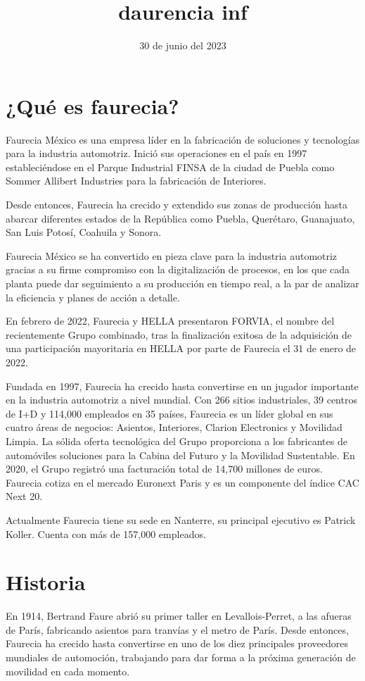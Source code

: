 \documentclass[letterpaper,12pt]{article}
\title {\textbf{daurencia inf}}
\date{30 de junio del 2023}
\begin{document}
\begin{sloppypar} 
\section*{¿Qué es faurecia?}
Faurecia México es una empresa líder en la fabricación de soluciones y tecnologías para la industria automotriz. Inició sus operaciones en el país en 1997 estableciéndose en el Parque Industrial FINSA de la ciudad de Puebla como Sommer Allibert Industries para la fabricación de Interiores.

Desde entonces, Faurecia ha crecido y extendido sus zonas de producción hasta abarcar diferentes estados de la República como Puebla, Querétaro, Guanajuato, San Luis Potosí, Coahuila y Sonora.

Faurecia México se ha convertido en pieza clave para la industria automotriz gracias a su firme compromiso con la digitalización de procesos, en los que cada planta puede dar seguimiento a su producción en tiempo real, a la par de analizar la eficiencia y planes de acción a detalle. 

En febrero de 2022, Faurecia y HELLA presentaron FORVIA, el nombre del recientemente Grupo combinado, tras la finalización exitosa de la adquisición de una participación mayoritaria en HELLA por parte de Faurecia el 31 de enero de 2022.

Fundada en 1997, Faurecia ha crecido hasta convertirse en un jugador importante en la industria automotriz a nivel mundial. Con 266 sitios industriales, 39 centros de I+D y 114,000 empleados en 35 países, Faurecia es un líder global en sus cuatro áreas de negocios: Asientos, Interiores, Clarion Electronics y Movilidad Limpia. La sólida oferta tecnológica del Grupo proporciona a los fabricantes de automóviles soluciones para la Cabina del Futuro y la Movilidad Sustentable. En 2020, el Grupo registró una facturación total de 14,700 millones de euros. Faurecia cotiza en el mercado Euronext Paris y es un componente del índice CAC Next 20.

Actualmente Faurecia tiene su sede en Nanterre, su principal ejecutivo es Patrick Koller. Cuenta con más de 157,000 empleados.

\section*{Historia}
En 1914, Bertrand Faure abrió su primer taller en Levallois-Perret, a las afueras de París, fabricando asientos para tranvías y el metro de París. Desde entonces, Faurecia ha crecido hasta convertirse en uno de los diez principales proveedores mundiales de automoción, trabajando para dar forma a la próxima generación de movilidad en cada momento.


\end{sloppypar}
\end{document}
